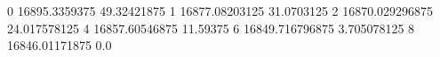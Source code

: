 0 16895.3359375 49.32421875
1 16877.08203125 31.0703125
2 16870.029296875 24.017578125
4 16857.60546875 11.59375
6 16849.716796875 3.705078125
8 16846.01171875 0.0
